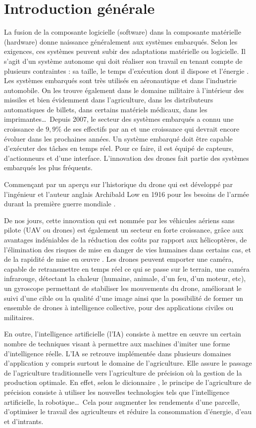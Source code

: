 
\chapter*{Introduction générale}
La fusion de la composante logicielle (software) dans la composante matérielle (hardware) donne naissance généralement aux systèmes embarqués.
Selon les exigences, ces systèmes peuvent subir des adaptations matérielle ou logicielle. Il s'agit d'un système autonome qui doit réaliser son travail en tenant compte de plusieurs contraintes : sa taille, le temps d'exécution dont il dispose et l'énergie \cite{FUTURA}. Les systèmes embarqués sont très utilisés en aéronautique et dans l'industrie automobile. On les trouve également dans le domaine militaire à l'intérieur des missiles et bien évidemment dans l'agriculture, dans les distributeurs automatiques de billets, dans certains matériels médicaux, dans les imprimantes\ldots\  Depuis 2007, le secteur des systèmes embarqués a connu une croissance de $9,9\%$ de ses effectifs par an \cite{PierreAudoin2012} et une croissance qui devrait encore évoluer dans les prochaines années. Un système embarqué doit être capable d'exécuter des tâches en temps réel. Pour ce faire, il est équipé de capteurs, d'actionneurs et d'une interface. L'innovation des drones fait partie des systèmes embarqués les plus fréquents. 

Commençant par un aperçu sur l'historique du drone qui est développé par l'ingénieur et l'auteur anglais Archibald Low en 1916 pour les besoins de l'armée durant la première guerre mondiale \cite{STUDIOFLY}. 

De nos jours, cette innovation qui est nommée par les véhicules aériens sans pilote (UAV ou drones) est également un secteur en forte croissance, grâce aux avantages indéniables de la réduction des coûts par rapport aux hélicoptères, de l'élimination des risques de mise en danger de vies humaines dans certains cas, et de la rapidité de mise en œuvre \cite{AltiGator}. Les drones peuvent emporter une caméra, capable de retransmettre en temps réel ce qui se passe sur le terrain, une caméra infrarouge, détectant la chaleur (humaine, animale, d'un feu, d'un moteur, etc), un gyroscope permettant de stabiliser les mouvements du drone, améliorant le suivi d'une cible ou la qualité d'une image ainsi que la possibilité de former un ensemble de drones à intelligence collective, pour des applications civiles ou militaires. 

En outre, l'intelligence artificielle (l'IA) consiste à mettre en œuvre un certain nombre de techniques visant à permettre aux machines d'imiter une forme d'intelligence réelle. L'IA se retrouve implémentée dans plusieurs domaines d'application\cite{netactions} y compris surtout le domaine de l'agriculture. Elle assure le passage de l'agriculture traditionnelle vers l'agriculture de précision où la gestion de la production optimale. En effet, selon le dicionnaire \cite{leshorizons}, le principe de l'agriculture de précision consiste à utiliser les nouvelles technologies tels que l'intelligence artificielle, la robotique\ldots\ Cela pour augmenter les rendements d'une parcelle, d'optimiser le travail des agriculteurs et réduire la consommation d'énergie, d'eau et d'intrants.

